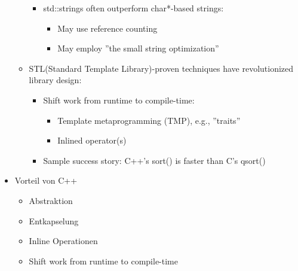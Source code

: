 \begin{itemize}
\begin{itemize}
		\begin{itemize}
			\item std::strings often outperform char*-based strings:
			\begin{itemize}
				\item May use reference counting
				\item May employ ''the small string optimization''
			\end{itemize}
		\end{itemize}
		\item STL(Standard Template Library)-proven techniques have revolutionized library design:
		\begin{itemize}
			\item Shift work from runtime to compile-time:
			\begin{itemize}
				\item Template metaprogramming (TMP), e.g., ''traits''
				\item Inlined operator(s)
			\end{itemize}
			\item Sample success story: C++'s sort() is faster than C's qsort()
		\end{itemize}
	\end{itemize}
	\item Vorteil von C++
    	\begin{itemize}
	        \item Abstraktion
	        \item Entkapselung
	        \item Inline Operationen
	        \item Shift work from runtime to compile-time
    	\end{itemize}
\end{itemize}

